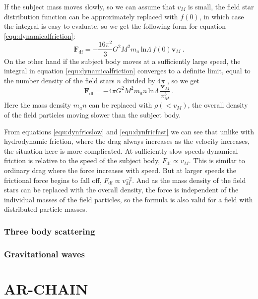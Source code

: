 \documentclass[english, oneside]{HYgradu}
\begin{document}
If the subject mass moves slowly, so we can assume that $v_M$ is small, the field star distribution function can be approximately replaced with $f(0)$, in which case the integral is easy to evaluate, so we get the following form for equation \ref{equ:dynamicalfriction}: 
\begin{equation}
\mathbf{F}_{\mathrm{df}} = -\frac{16 \pi^2}{3} G^2 M^2 m_a \, \mathrm{ln} \Lambda \, f(0) \mathbf{v}_M \ . \label{equ:dynfricslow}
\end{equation}
On the other hand if the subject body moves at a sufficiently large speed, the integral in equation \ref{equ:dynamicalfriction} converges to a definite limit, equal to the number density of the field stars $n$ divided by $4\pi$ \citep{bt-galdyn}, so we get
\begin{equation}
\mathbf{F}_{\mathrm{df}} = -4 \pi G^2 M^2 m_a n \, \mathrm{ln} \Lambda \, \frac{\mathbf{v}_M}{v_M^3} \ . \label{equ:dynfricfast}
\end{equation}
Here the mass density $m_a n$ can be replaced with $\rho(< v_M)$, the overall density of the field particles moving slower than the subject body.

From equations \ref{equ:dynfricslow} and \ref{equ:dynfricfast} we can see that unlike with hydrodynamic friction, where the drag always increases as the velocity increases, the situation here is more complicated. At sufficiently slow speeds dynamical friction is relative to the speed of the subject body, $F_{\mathrm{df}} \propto v_M$. This is similar to ordinary drag where the force increases with speed. But at larger speeds the frictional force begins to fall off, $F_{\mathrm{df}} \propto v_M^{-2}$. And as the mass density of the field stars can be replaced with the overall density, the force is independent of the individual masses of the field particles, so the formula is also valid for a field with distributed particle masses.

\subsection{Three body scattering}


\subsection{Gravitational waves}



\chapter{AR-CHAIN} \label{chap:ar-chain}
\end{document}
